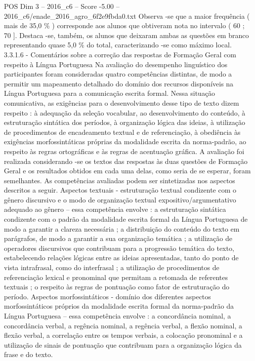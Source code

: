 \begin{textsample}{POS Dim 3 – 2016\_c6 – Score -5.00 – 2016\_c6/enade\_2016\_agro\_6f2e9fbda0.txt}
Observa -se que a maior frequência ( mais de 35,0 \% ) corresponde aos alunos que obtiveram nota no intervalo ( 60 ; 70 ].
Destaca -se, também, os alunos que deixaram ambas as questões em branco representando quase 5,0 \% do total, caracterizando -se como máximo local. 3.3.1.6 - Comentários sobre a correção das respostas de Formação Geral com respeito à Língua Portuguesa Na avaliação do desempenho linguístico dos participantes foram consideradas quatro competências distintas, de modo a permitir um mapeamento detalhado do domínio dos recursos disponíveis na Língua Portuguesa para a comunicação escrita formal.
Nessa situação comunicativa, as exigências para o desenvolvimento desse tipo de texto dizem respeito : à adequação da seleção vocabular, ao desenvolvimento do conteúdo, à estruturação sintática dos períodos, à organização lógica das ideias, à utilização de procedimentos de encadeamento textual e de referenciação, à obediência às exigências morfossintáticas próprias da modalidade escrita da norma-padrão, ao respeito às regras ortográficas e às regras de acentuação gráfica.
A avaliação foi realizada considerando -se os textos das respostas às duas questões de Formação Geral e os resultados obtidos em cada uma delas, como seria de se esperar, foram semelhantes.
As competências avaliadas podem ser sintetizadas nos aspectos descritos a seguir.
Aspectos textuais - estruturação textual condizente com o gênero discursivo e o modo de organização textual expositivo/argumentativo adequado ao gênero – essa competência envolve : a estruturação sintática condizente com o padrão da modalidade escrita formal da Língua Portuguesa de modo a garantir a clareza necessária ; a distribuição do conteúdo do texto em parágrafos, de modo a garantir a sua organização temática ; a utilização de operadores discursivos que contribuam para a progressão temática do texto, estabelecendo relações lógicas entre as ideias apresentadas, tanto do ponto de vista intrafrasal, como do interfrasal ; a utilização de procedimentos de referenciação lexical e pronominal que permitam a retomada de referentes textuais ; o respeito às regras de pontuação como fator de estruturação do período.
Aspectos morfossintáticos - domínio dos diferentes aspectos morfossintáticos próprios da modalidade escrita formal da norma-padrão da Língua Portuguesa – essa competência envolve : a concordância nominal, a concordância verbal, a regência nominal, a regência verbal, a flexão nominal, a flexão verbal, a correlação entre os tempos verbais, a colocação pronominal e a utilização de sinais de pontuação que contribuam para a organização lógica da frase e do texto.

\end{textsample}
